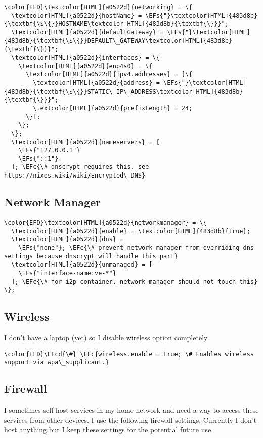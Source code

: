 \documentclass[14pt]{article}
\newcommand{\EFc}[1]{\textcolor{EFc}{#1}} %
\newcommand{\EFcd}[1]{\textcolor{EFcd}{#1}} %
\newcommand{\EFs}[1]{\textcolor{EFs}{#1}} %
\begin{document}
\begin{Code}
\begin{Verbatim}
\color{EFD}\textcolor[HTML]{a0522d}{networking} = \{
  \textcolor[HTML]{a0522d}{hostName} = \EFs{"}\textcolor[HTML]{483d8b}{\textbf{\$\{}}HOSTNAME\textcolor[HTML]{483d8b}{\textbf{\}}}";
  \textcolor[HTML]{a0522d}{defaultGateway} = \EFs{"}\textcolor[HTML]{483d8b}{\textbf{\$\{}}DEFAULT\_GATEWAY\textcolor[HTML]{483d8b}{\textbf{\}}}";
  \textcolor[HTML]{a0522d}{interfaces} = \{
    \textcolor[HTML]{a0522d}{enp4s0} = \{
      \textcolor[HTML]{a0522d}{ipv4.addresses} = [\{
        \textcolor[HTML]{a0522d}{address} = \EFs{"}\textcolor[HTML]{483d8b}{\textbf{\$\{}}STATIC\_IP\_ADDRESS\textcolor[HTML]{483d8b}{\textbf{\}}}";
        \textcolor[HTML]{a0522d}{prefixLength} = 24;
      \}];
    \};
  \};
  \textcolor[HTML]{a0522d}{nameservers} = [
    \EFs{"127.0.0.1"}
    \EFs{"::1"}
  ]; \EFc{\# dnscrypt requires this. see https://nixos.wiki/wiki/Encrypted\_DNS}
\end{Verbatim}
\end{Code}
\subsection{Network Manager}
\label{sec:org52b879b}
\begin{Code}
\begin{Verbatim}
\color{EFD}\textcolor[HTML]{a0522d}{networkmanager} = \{
  \textcolor[HTML]{a0522d}{enable} = \textcolor[HTML]{483d8b}{true};
  \textcolor[HTML]{a0522d}{dns} =
    \EFs{"none"}; \EFc{\# prevent network manager from overriding dns settings because dnscrypt will handle this part}
  \textcolor[HTML]{a0522d}{unmanaged} = [
    \EFs{"interface-name:ve-*"}
  ]; \EFc{\# for i2p container. network manager should not touch this}
\};
\end{Verbatim}
\end{Code}
\subsection{Wireless}
\label{sec:org962becd}
I don't have a laptop (yet) so I disable wireless option completely
\begin{Code}
\begin{Verbatim}
\color{EFD}\EFcd{\#} \EFc{wireless.enable = true; \# Enables wireless support via wpa\_supplicant.}
\end{Verbatim}
\end{Code}
\subsection{Firewall}
\label{sec:org20d9ef5}
I sometimes self-host services in my home network and need a way to access these services from other devices. I use the following firewall settings. Currently I don't host anything but I keep these settings for the potential future use
\end{document}
